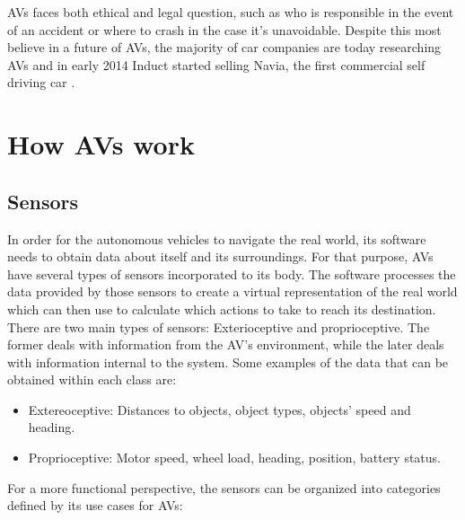 \documentclass[11pt]{article}
\begin{document}
AVs faces both ethical and legal question, such as who is responsible in the event of an accident or where to crash in the case it's unavoidable. Despite this most believe in a future of AVs, the majority of car companies are today researching AVs and in early 2014 Induct started selling Navia, the first commercial self driving car \cite{Maisto2014Navia}.


\section{How AVs work}
\subsection{Sensors}
In order for the autonomous vehicles to navigate the real world, its software needs to obtain data about itself and its surroundings. For that purpose, AVs have several types of sensors incorporated to its body. The software processes the data provided by those sensors to create a virtual representation of the real world which can then use to calculate which actions to take to reach its destination. There are two main types of sensors: Exterioceptive and proprioceptive. The former deals with information from the AV's environment, while the later deals with information internal to the system. Some examples of the data that can be obtained within each class are:
\begin{itemize}
	\item Extereoceptive: Distances to objects, object types, objects' speed and heading.
	\item Proprioceptive: Motor speed, wheel load, heading, position, battery status.
\end{itemize}
For a more functional perspective, the sensors can be organized into categories defined by its use cases for AVs:
\end{document}
